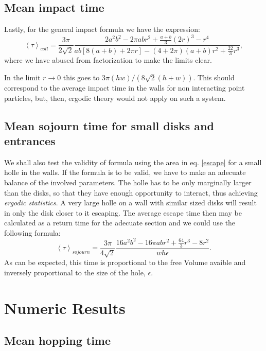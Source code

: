 \documentclass[a4paper,10pt, jcp, aps, preprint]{revtex4-1}
\newcommand{\mean}[1]{\left \langle #1 \right \rangle}
\begin{document}
\subsection{Mean impact time}

Lastly, for the general impact formula we have the expression:
\begin{equation}
 \mean{\tau}_{coll} = 	
\frac{3 \pi}{2\sqrt{2}}
\frac { 2a^{2} b^{2}  -  2\pi a b r^{2} + \frac{a+b}{3}(2r)^3 - r^4}
{ab[8(a+b)+2\pi r]- (4+2\pi)(a+b)r^2+\frac{22}{3} r^3},
\end{equation}
where we have abused from factorization to make the limits clear.

In the limit $r\rightarrow 0$ this goes to $3 \pi (hw)/(8\sqrt{2}(h+w))$.
This should correspond to the average impact time in the walls
for non interacting point particles, 
but, then, ergodic theory would not apply
on such a system. 

\subsection{Mean sojourn  time for small disks and entrances}

We shall also test the validity of formula using the area in eq. \ref{escape}
for a small holle in the walls. If the formula is to be valid, we have
to make an adecuate balance of the involved parameters. The holle has to
be only marginally larger than the disks, so that they have enough opportunity
to interact, thus achieving \emph{ergodic statistics}. A very large holle
on a wall with similar sized disks will result in only the disk closer to
it escaping. The average escape time then may be calculated as
a return time for the adecuate section and we could use the following formula:
\begin{equation} 
\mean{\tau}_{sojourn} = 	
\frac{3 \pi}{4\sqrt{2}}
\frac {16a^2b^2-16\pi a b r^2 + \frac{64}{3} r^3 - 8 r^2  }
{wh\epsilon}.
\end{equation}
As can be expected, this time is proportional to the
free Volume avaible and inversely proportional to the size of the hole, $\epsilon$.

\section{Numeric Results}

\subsection{Mean hopping time}
\end{document}
